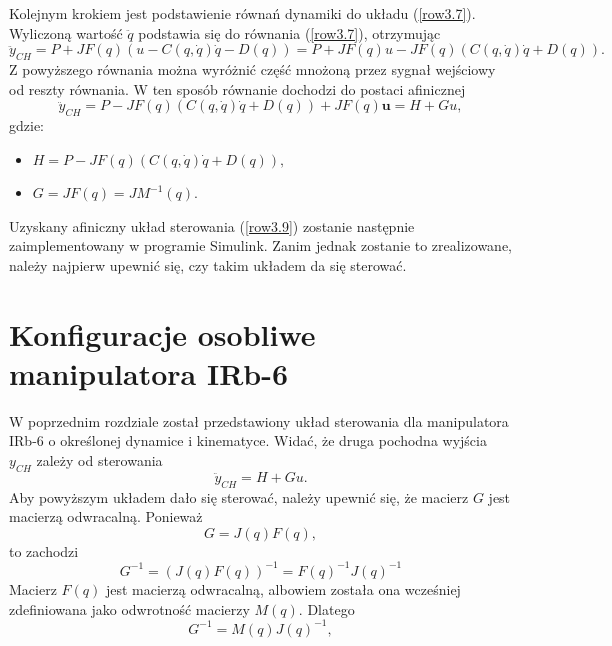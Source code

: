 \documentclass[eng,printmode]{mgr}
\begin{document}
      Kolejnym krokiem jest podstawienie równań dynamiki do  układu (\ref{row3.7}). Wyliczoną wartość $\ddot{q}$ podstawia się do równania (\ref{row3.7}), otrzymując
     \begin{equation}
\ddot{y}_{CH}= P +JF(q)(u - C(q, \dot{q})\dot{q} - D(q))=P+JF(q)u-JF(q)(C(q, \dot{q})\dot{q} + D(q)).
\end{equation} 
Z powyższego równania można wyróżnić część mnożoną przez sygnał wejściowy od reszty równania. W ten sposób równanie dochodzi do postaci afinicznej
 \begin{equation}
\ddot{y}_{CH}= P-JF(q)(C(q, \dot{q})\dot{q} + D(q))+JF(q)\textbf{u}=H+Gu,\label{row3.9}
\end{equation} 
gdzie:
\begin{itemize}
\item$H=P -JF(q)(C(q, \dot{q})\dot{q} + D(q)),$
\item$G=JF(q)=JM^{-1}(q).$
\end{itemize}

Uzyskany afiniczny układ sterowania (\ref{row3.9}) zostanie następnie zaimplementowany w programie Simulink. Zanim jednak zostanie to zrealizowane, należy najpierw upewnić się, czy takim układem da się sterować.

\section{Konfiguracje osobliwe manipulatora IRb-6}
W poprzednim rozdziale został przedstawiony układ sterowania dla manipulatora IRb-6 o określonej dynamice i kinematyce. Widać, że druga pochodna wyjścia $y_{CH}$ zależy od sterowania
\begin{equation}
\ddot{y}_{CH}=H+Gu.
\end{equation} 
Aby powyższym układem dało się sterować, należy upewnić się, że macierz $G$ jest macierzą odwracalną. Ponieważ 
\begin{equation}
G=J(q)F(q),
\end{equation} 
to zachodzi
\begin{equation}
G^{-1}=(J(q)F(q))^{-1}=F(q)^{-1}J(q)^{-1}
\end{equation} 
Macierz $F(q)$ jest macierzą odwracalną, albowiem została ona wcześniej zdefiniowana jako odwrotność macierzy $M(q)$. Dlatego
\begin{equation}
G^{-1}=M(q)J(q)^{-1},
\end{equation} 
\end{document}
